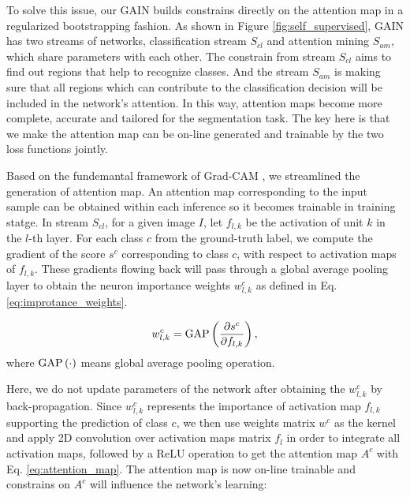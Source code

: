 \documentclass[10pt,twocolumn,letterpaper]{article}
\begin{document}
To solve this issue, our GAIN builds constrains directly on the attention map in a regularized bootstrapping fashion. As shown in Figure \ref{fig:self_supervised}, GAIN has two streams of networks, classification stream ${S_{cl}}$ and attention mining ${S_{am}}$, which share parameters with each other. The constrain from stream ${S_{cl}}$ aims to find out regions that help to recognize classes. And the stream ${S_{am}}$ is making sure that all regions which can contribute to the classification decision will be included in the network's attention. In this way, attention maps become more complete, accurate and tailored for the segmentation task. The key here is that we make the attention map can be on-line generated and trainable by the two loss functions jointly.


Based on the fundemantal framework of Grad-CAM \cite{grad-cam}, we streamlined the generation of attention map.  An attention map corresponding to the input sample can be obtained within each inference so it becomes trainable in training statge. In stream ${S_{cl}}$, for a given image $I$, let $f_{l,k}$ be the activation of unit $k$ in the $l$-th layer. For each class $c$ from the ground-truth label, we compute the gradient of the score $s^c$ corresponding to class $c$, with respect to activation maps of $f_{l,k}$. These gradients flowing back will pass through a global average pooling layer \cite{lin2013network} to obtain the neuron importance weights $w_{l,k}^c$ as defined in Eq. \ref{eq:improtance_weights}.



\begin{equation}
\label{eq:improtance_weights}
w_{l,k}^c = {\mathop{\rm GAP}\nolimits}\left( {\frac{{\partial {s^c}}}{{\partial {f_{l,k}}}}} \right),
\end{equation}
where ${\mathop{\rm GAP}\nolimits} \left(  \cdot  \right)$ means global average pooling operation.


Here, we do not update parameters of the network after obtaining the $w_{l,k}^c$ by back-propagation. Since $w_{l,k}^c$ represents the importance of activation map $f_{l,k}$ supporting the prediction of class $c$, we then use weights matrix $w^c$ as the kernel and apply 2D convolution over activation maps matrix $f_{l}$ in order to integrate all activation maps, followed by a ReLU operation to get the attention map $A^c$ with Eq. \ref{eq:attention_map}. The attention map is now on-line trainable and constrains on $A^c$ will influence the network's learning:
\end{document}

